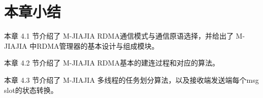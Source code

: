{    %







    \section{本章小结}
    本章 4.1 节介绍了 M-JIAJIA RDMA通信模式与通信原语选择，并给出了 M-JIAJIA 中RDMA管理器的基本设计与组成模块。

    本章 4.2 节介绍了 M-JIAJIA RDMA基本的建连过程和对应的算法。

    本章 4.3 节介绍了 M-JIAJIA 多线程的任务划分算法，以及接收端发送端每个msg slot的状态转换。
}